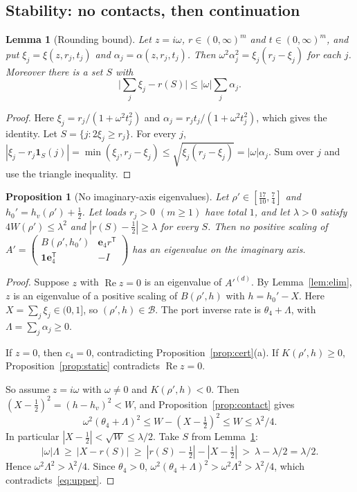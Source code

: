 \documentclass[11pt,a4paper]{article}
\theoremstyle{plain}
\newtheorem{proposition}[theorem]{Proposition}
\newtheorem{lemma}[theorem]{Lemma}
\theoremstyle{definition}
\theoremstyle{remark}
\newcommand{\Real}{\operatorname{Re}}
\newcommand{\one}{\mathbf{1}}
\newcommand{\cB}{\mathcal{B}}
\newcommand{\scl}[2]{#1^{(#2)}}
\newcommand{\be}{\mathbf{e}}
\begin{document}
\subsection{Stability: no contacts, then continuation}

\begin{lemma}[Rounding bound]\label{lem:rounding}
Let $z=i\omega$, $r\in(0,\infty)^m$ and $t\in(0,\infty)^m$, and put
$\xi_j=\xi(z,r_j,t_j)$ and $\alpha_j=\alpha(z,r_j,t_j)$. Then
$\omega^2\alpha_j^2=\xi_j(r_j-\xi_j)$ for each $j$. Moreover there is a set $S$ with
\[
\textstyle\bigl|\sum_j\xi_j-r(S)\bigr|\le|\omega|\sum_j\alpha_j .
\]
\end{lemma}
\begin{proof}
Here $\xi_j=r_j/(1+\omega^2t_j^2)$ and $\alpha_j=r_jt_j/(1+\omega^2t_j^2)$, which gives the
identity. Let $S=\{j:2\xi_j\ge r_j\}$. For every $j$,
$|\xi_j-r_j\one_S(j)|=\min(\xi_j,r_j-\xi_j)\le\sqrt{\xi_j(r_j-\xi_j)}=|\omega|\alpha_j$. Sum
over $j$ and use the triangle inequality.
\end{proof}

\begin{proposition}[No imaginary-axis eigenvalues]\label{prop:noaxis}
Let $\rho'\in[\tfrac{17}{10},\tfrac74]$ and $h_0'=h_v(\rho')+\tfrac12$. Let loads $r_j>0$
$(m\ge1)$ have total $1$, and let $\lambda>0$ satisfy $4W(\rho')\le\lambda^2$ and
$|r(S)-\tfrac12|\ge\lambda$ for every $S$. Then no positive scaling of
$A'=\begin{pmatrix}B(\rho',h_0')&\be_4r^{\mathsf T}\\ \one \be_4^{\mathsf T}&-I\end{pmatrix}$
has an eigenvalue on the imaginary axis.
\end{proposition}
\begin{proof}
Suppose $z$ with $\Real z=0$ is an eigenvalue of $\scl{A'}d$. By Lemma~\ref{lem:elim}, $z$
is an eigenvalue of a positive scaling of $B(\rho',h)$ with $h=h_0'-X$. Here
$X=\sum_j\xi_j\in(0,1]$, so $(\rho',h)\in\cB$. The port inverse rate is $\theta_4+\Lambda$,
with $\Lambda=\sum_j\alpha_j\ge0$.

If $z=0$, then $c_4=0$, contradicting Proposition~\ref{prop:cert}(a). If $K(\rho',h)\ge0$,
Proposition~\ref{prop:static} contradicts $\Real z=0$.

So assume $z=i\omega$ with $\omega\ne0$ and $K(\rho',h)<0$. Then
$(X-\tfrac12)^2=(h-h_v)^2<W$, and Proposition~\ref{prop:contact} gives
\begin{equation}\label{eq:upper}
\omega^2(\theta_4+\Lambda)^2\le W-(X-\tfrac12)^2\le W\le\lambda^2/4 .
\end{equation}
In particular $|X-\tfrac12|<\sqrt W\le\lambda/2$. Take $S$ from Lemma~\ref{lem:rounding}:
\[
|\omega|\Lambda\ \ge\ |X-r(S)|\ \ge\ |r(S)-\tfrac12|-|X-\tfrac12|\ >\ \lambda-\lambda/2=\lambda/2 .
\]
Hence $\omega^2\Lambda^2>\lambda^2/4$. Since $\theta_4>0$,
$\omega^2(\theta_4+\Lambda)^2>\omega^2\Lambda^2>\lambda^2/4$, which contradicts~\eqref{eq:upper}.
\end{proof}
\end{document}
